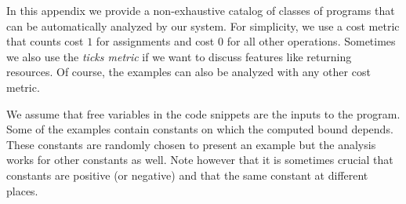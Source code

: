 \documentclass[nocopyrightspace,preprint]{sigplanconf}
\begin{document}
In this appendix we provide a non-exhaustive catalog of classes of
programs that can be automatically analyzed by our system.  For
simplicity, we use a cost metric that counts cost $1$ for assignments
and cost $0$ for all other operations.  Sometimes we also use the
\emph{ticks metric} if we want to discuss features like returning
resources.  Of course, the examples can also be analyzed with any other
cost metric.

We assume that free variables in the code snippets are the inputs to
the program. Some of the examples contain constants on which the
computed bound depends.  These constants are randomly chosen to
present an example but the analysis works for other constants as well.
Note however that it is sometimes crucial that constants are positive
(or negative) and that the same constant at different places.
\end{document}
